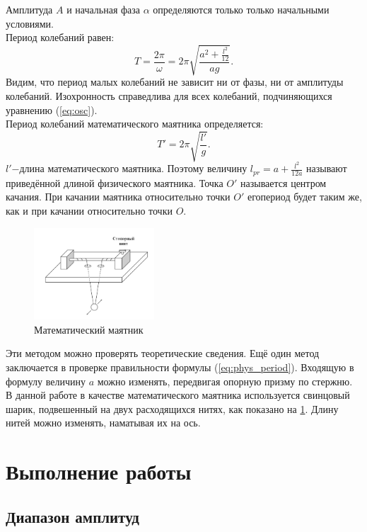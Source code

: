 \documentclass[13pt,a4paper]{article}
\begin{document}
Амплитуда $A$ и начальная фаза $\alpha$ определяются только только начальными условиями.\\
Период колебаний равен:
\begin{equation}
	T=\frac{2\pi}{\omega}=2\pi\sqrt{\frac{a^2+\frac{l^2}{12}}{ag}}.
	\label{eq:phys_period}
\end{equation}
Видим, что период малых колебаний не зависит ни от фазы, ни от амплитуды колебаний. Изохронность справедлива для всех колебаний, подчиняющихся уравнению (\ref{eq:osc}).\\
Период колебаний математического маятника определяется:
\begin{equation}
	T'=2\pi\sqrt{\frac{l'}{g}}.
	\label{eq:math_period}
\end{equation}
$l'$$-$длина математического маятника. Поэтому величину $l_{pr}=a+\frac{l^2}{12a}$ называют приведённой длиной физического маятника. Точка $O'$ называется центром качания. При качании маятника относительно точки $O'$ егопериод будет таким же, как и при качании относительно точки $O$.  
\begin{figure}
   		\includegraphics[width=0.4\textwidth]{mathpend}
    	\caption{Математический маятник}
    	\label{ris:mathpend}
\end{figure}
\newpage
Эти методом можно проверять теоретические сведения. Ещё один метод заключается в проверке правильности формулы (\ref{eq:phys_period}). Входящую в формулу величину $a$ можно изменять, передвигая опорную призму по стержню. В данной работе в качестве математического маятника используется свинцовый шарик, подвешенный на двух расходящихся нитях, как показано на \ref{ris:mathpend}. Длину нитей можно изменять, наматывая их на ось.
\newpage


\section{Выполнение работы}


\subsection{Диапазон амплитуд}
\end{document}
